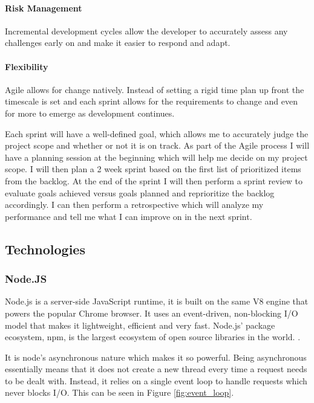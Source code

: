 \documentclass{article}
\begin{document}
\paragraph{Risk Management} Incremental development cycles allow the developer to accurately assess any challenges early on and make it easier to respond and adapt.

\paragraph{Flexibility} Agile allows for change natively. Instead of setting a rigid time plan up front the timescale is set and each sprint allows for the requirements to change and even for more to emerge as development continues.

Each sprint will have a well-defined goal, which allows me to accurately judge the project scope and whether or not it is on track. As part of the Agile process I will have a planning session at the beginning which will help me decide on my project scope. I will then plan a 2 week sprint based on the first list of prioritized items from the backlog.  At the end of the sprint I will then perform a sprint review to evaluate goals achieved versus goals planned and reprioritize the backlog accordingly. I can then perform a retrospective which will analyze my performance and tell me what I can improve on in the next sprint.


\subsection{Technologies}
\subsubsection{Node.JS}
Node.js is a server-side JavaScript runtime, it is built on the same V8 engine that powers the popular Chrome browser. It uses an event-driven, non-blocking I/O model that makes it lightweight, efficient and very fast. Node.js' package ecosystem, npm, is the largest ecosystem of open source libraries in the world. \citep{Nodejs.org2016}.

It is node's asynchronous nature which makes it so powerful. Being asynchronous essentially means that it does not create a new thread every time a request needs to be dealt with. Instead, it relies on a single event loop to handle requests which never blocks I/O. This can be seen in Figure \ref{fig:event_loop}.
\end{document}

